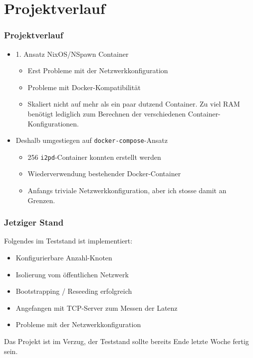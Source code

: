 \documentclass{beamer}
\begin{document}
\section{Projektverlauf}

    \begin{frame}
        \frametitle{Projektverlauf}

        \begin{itemize}
            \item 1. Ansatz NixOS/NSpawn Container
                \begin{itemize}
                    \item Erst Probleme mit der Netzwerkkonfiguration
                    \item Probleme mit Docker-Kompatibilität
                    \item Skaliert nicht auf mehr als ein paar dutzend Container. Zu viel RAM benötigt lediglich zum Berechnen der verschiedenen Container-Konfigurationen.
                \end{itemize}
            \item Deshalb umgestiegen auf \lstinline|docker-compose|-Ansatz
                \begin{itemize}
                    \item 256 \lstinline|i2pd|-Container konnten erstellt werden
                    \item Wiederverwendung bestehender Docker-Container
                    \item Anfangs triviale Netzwerkkonfiguration, aber ich stosse damit an Grenzen.
                \end{itemize}
        \end{itemize}
    \end{frame}


    \begin{frame}
        \frametitle{Jetziger Stand}

        Folgendes im Teststand ist implementiert:

        \begin{itemize}
            \item Konfigurierbare Anzahl-Knoten
            \item Isolierung vom öffentlichen Netzwerk
            \item Bootstrapping / Reseeding erfolgreich
            \item Angefangen mit TCP-Server zum Messen der Latenz
            \item Probleme mit der Netzwerkkonfiguration
        \end{itemize}

        Das Projekt ist im Verzug, der Teststand sollte bereits Ende letzte Woche fertig sein.
    \end{frame}
\end{document}
